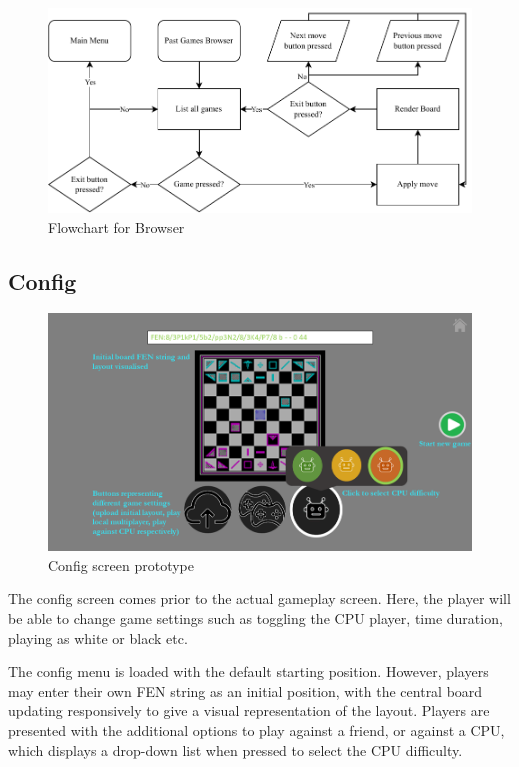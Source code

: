 \documentclass[../main/main.tex]{subfiles}
\begin{document}
\begin{figure}[H]
    \centering
    \includegraphics[width=\columnwidth]{../design/assets/browser_flowchart.pdf}
    \caption{Flowchart for Browser}
    \label{fig:browser-flowchart}
\end{figure}

\subsection{Config}
\begin{figure}[H]
    \centering
    \includegraphics[width=0.8\columnwidth]{../design/assets/config_gui.png}
    \caption{Config screen prototype}
    \label{fig:config-gui}
\end{figure}

The config screen comes prior to the actual gameplay screen. Here, the player will be able to change game settings such as toggling the CPU player, time duration, playing as white or black etc.

The config menu is loaded with the default starting position. However, players may enter their own FEN string as an initial position, with the central board updating responsively to give a visual representation of the layout. Players are presented with the additional options to play against a friend, or against a CPU, which displays a drop-down list when pressed to select the CPU difficulty.
\end{document}
